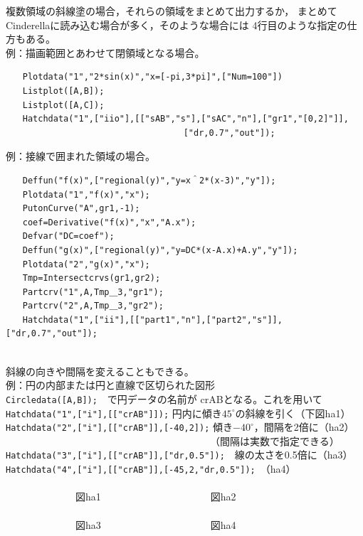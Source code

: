 \documentclass[papersize,a4paper,12pt,uplatex]{jsarticle}
\begin{document}
\begin{description}
複数領域の斜線塗の場合，それらの領域をまとめて出力するか，
まとめてCinderellaに読み込む場合が多く，そのような場合には
4行目のような指定の仕方もある。\\

例：描画範囲とあわせて閉領域となる場合。
\begin{verbatim}
　　Plotdata("1","2*sin(x)","x=[-pi,3*pi]",["Num=100"])
　　Listplot([A,B]);
　　Listplot([A,C]);
　　Hatchdata("1",["iio"],[["sAB","s"],["sAC","n"],["gr1","[0,2]"]],
　　　　　　　　　　　　　　　　　　　　　["dr,0.7","out"]);
\end{verbatim}
\begin{center}

\end{center}

\newpage

例：接線で囲まれた領域の場合。
\begin{verbatim}
　　Deffun("f(x)",["regional(y)","y=x＾2*(x-3)","y"]);
　　Plotdata("1","f(x)","x");
　　PutonCurve("A",gr1,-1);
　　coef=Derivative("f(x)","x","A.x");
　　Defvar("DC=coef");
　　Deffun("g(x)",["regional(y)","y=DC*(x-A.x)+A.y","y"]);
　　Plotdata("2","g(x)","x");
　　Tmp=Intersectcrvs(gr1,gr2);
　　Partcrv("1",A,Tmp＿3,"gr1");
　　Partcrv("2",A,Tmp＿3,"gr2");
　　Hatchdata("1",["ii"],[["part1","n"],["part2","s"]],["dr,0.7","out"]);
\end{verbatim}
\begin{center}

\end{center}
　\\
斜線の向きや間隔を変えることもできる。\\

\noindent
例：円の内部または円と直線で区切られた図形\\
\verb|Circledata([A,B]);|　で円データの名前が crABとなる。これを用いて\\
\verb|Hatchdata("1",["i"],[["crAB"]]);|
円内に傾き$45^{\circ}$の斜線を引く（下図ha1）\\
\verb|Hatchdata("2",["i"],[["crAB"]],[-40,2]);| 傾き$-40^{\circ}$，間隔を2倍に（ha2）\\
　　　　　　　　　　　　　　　　　　　　　（間隔は実数で指定できる）\\
\verb|Hatchdata("3",["i"],[["crAB"]],["dr,0.5"]);|　線の太さを0.5倍に（ha3）\\
\verb|Hatchdata("4",["i"],[["crAB"]],[-45,2,"dr,0.5"]);|　（ha4）\\

　　　\\
　　　　　　　図ha1　　　　　　　　　　　図ha2\\
　　　\\
　　　　　　　図ha3　　　　　　　　　　　図ha4\\
　\\


\end{description}
\end{document}
